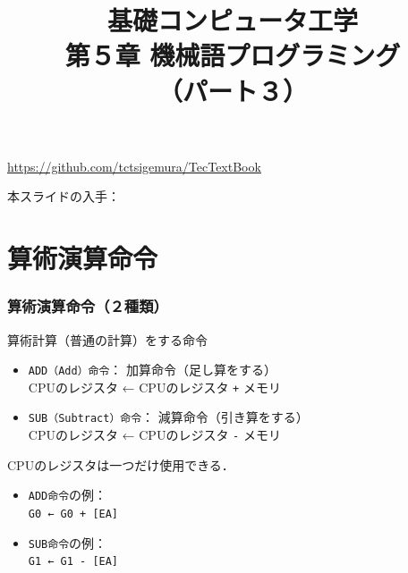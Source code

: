 \documentclass{beamer}                 %
\begin{document}
\title{基礎コンピュータ工学\\第５章 機械語プログラミング\\（パート３）}
\date{}

\begin{frame}
  \titlepage
  \centerline{\url{https://github.com/tctsigemura/TecTextBook}}
  \vfill
  \centerline{本スライドの入手：
    }
\end{frame}


\section{算術演算命令}
\begin{frame}
  \frametitle{算術演算命令（２種類）}
  算術計算（普通の計算）をする命令
  \begin{itemize}
  \item \texttt{ADD（Add）命令}： 加算命令（足し算をする） \\
    CPUのレジスタ ← CPUのレジスタ \texttt{+} メモリ
  \item \texttt{SUB（Subtract）命令}： 減算命令（引き算をする） \\
    CPUのレジスタ ← CPUのレジスタ \texttt{-} メモリ
  \end{itemize}
  \vfill
  CPUのレジスタは一つだけ使用できる．\\
  \begin{itemize}
  \item \texttt{ADD命令}の例：\\
    \texttt{G0 ← G0 + [EA]}
  \item \texttt{SUB命令}の例：\\
    \texttt{G1 ← G1 - [EA]}
  \end{itemize}
\end{frame}
\end{document}
